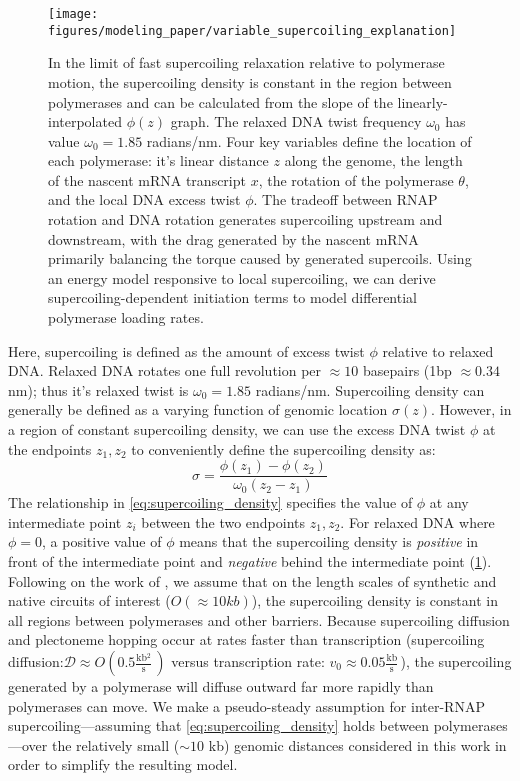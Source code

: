 \documentclass[11pt]{article}
\newcommand{\units}[2]{\frac{\text{#1}}{\text{#2}}\,}
\begin{document}
\begin{figure}[h]
    \centering
    \texttt{[image: figures/modeling\_paper/variable\_supercoiling\_explanation]}
    \caption{In the limit of fast supercoiling relaxation relative to polymerase motion, the supercoiling density is constant in the region between polymerases and can be calculated from the slope of the linearly-interpolated \(\phi(z)\) graph. The relaxed DNA twist frequency \(\omega_0\) has value \(\omega_0 = 1.85\) radians/nm. Four key variables define the location of each polymerase: it's linear distance \(z\) along the genome, the length of the nascent mRNA transcript \(x\), the rotation of the polymerase \(\theta\), and the local DNA excess twist \(\phi\). The tradeoff between RNAP rotation and DNA rotation generates supercoiling upstream and downstream, with the drag generated by the nascent mRNA primarily balancing the torque caused by generated supercoils. Using an energy model responsive to local supercoiling, we can derive supercoiling-dependent initiation terms to model differential polymerase loading rates.}
    \label{fig:key_variables_diagram}
\end{figure}
Here, supercoiling is defined as the amount of excess twist \(\phi\) relative to relaxed DNA. Relaxed DNA rotates  one full revolution per \(\approx10\) basepairs (1bp \(\approx 0.34\) nm); thus it's relaxed twist is \(\omega_0 = 1.85\) radians/nm. Supercoiling density can generally be defined as a varying function of genomic location \(\sigma(z)\). However, in a region of constant supercoiling density, we can use the excess DNA twist \(\phi\) at the endpoints \(z_1, z_2\) to conveniently define the supercoiling density as:
\begin{equation}
    \sigma = \frac{\phi(z_1) - \phi(z_2)}{\omega_0 (z_2 - z_1)}
\label{eq:supercoiling_density}
\end{equation}
The relationship in \cref{eq:supercoiling_density} specifies the value of \(\phi\) at any intermediate point \(z_i\) between the two endpoints \(z_1, z_2\). For relaxed DNA where \(\phi=0\), a positive value of \(\phi\) means that the supercoiling density is \emph{positive} in front of the intermediate point and \emph{negative} behind the intermediate point (\cref{fig:key_variables_diagram}). Following on the work of \textcite{sevierPropertiesGeneExpression2018}, we assume that on the length scales of synthetic and native circuits of interest (\(O(\approx10kb)\)), the supercoiling density is constant in all regions between polymerases and other barriers. Because supercoiling diffusion and plectoneme hopping \parencite{loenhoutDynamicsDNASupercoils2012} occur at rates faster than transcription (supercoiling diffusion:\(\mathcal{D} \approx O(0.5 \units{kb$^2$}{s})\) versus transcription rate: \(v_0 \approx 0.05 \units{kb}{s}\))\parencite{munizRNAPolymeraseII2021}, the supercoiling generated by a polymerase will diffuse outward far more rapidly than polymerases can move. We make a pseudo-steady assumption for inter-RNAP supercoiling---assuming that \cref{eq:supercoiling_density} holds between polymerases---over the relatively small (\(\sim 10\) kb) genomic distances considered in this work in order to simplify the resulting model.
\end{document}

